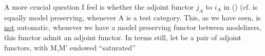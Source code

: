  A more crucial question I feel is whether the  adjoint functor
$j_{A}$ to $i_{A}$ in () (cf.   is equally model preserving, whenever A is a
test category. This, as we have seen, is \uline{not} automatic, whenever we
have a model preserving functor between modelizers,  this functor admit
an adjoint functor. In    terms  still, let
be a pair of adjoint functors, with M,M' endowed   ``saturated'' 
